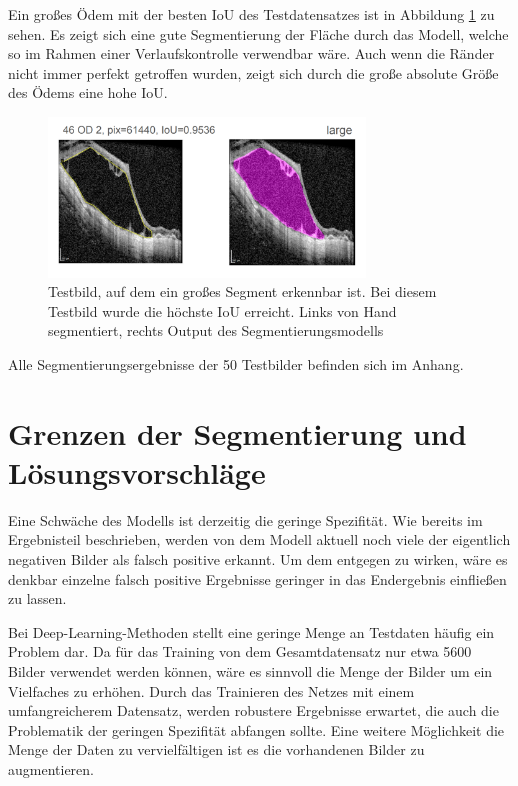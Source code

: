 Ein großes Ödem mit der besten IoU des Testdatensatzes ist in Abbildung \ref{fig:ergebnis_good3} zu sehen. Es zeigt sich eine gute Segmentierung der Fläche durch das Modell, welche so im Rahmen einer Verlaufskontrolle verwendbar wäre. Auch wenn die Ränder nicht immer perfekt getroffen wurden, zeigt sich durch die große absolute Größe des Ödems eine hohe IoU.\newline
\begin{figure}[ht!]
\centering
\includegraphics[width=0.75\textwidth]{./pic/Segmentierung/Segmentierungsergebnisse/50.PNG}
\caption{\label{fig:ergebnis_good3}Testbild, auf dem ein großes Segment erkennbar ist. Bei diesem Testbild wurde die höchste IoU erreicht. Links von Hand segmentiert, rechts Output des Segmentierungsmodells}
\end{figure}
Alle Segmentierungsergebnisse der 50 Testbilder befinden sich im Anhang.



\newpage
\section{Grenzen der Segmentierung und Lösungsvorschläge}


Eine Schwäche des Modells ist derzeitig die geringe Spezifität. Wie bereits im Ergebnisteil beschrieben, werden von dem Modell aktuell noch viele der eigentlich negativen Bilder als falsch positive erkannt. 
Um dem entgegen zu wirken, wäre es denkbar einzelne falsch positive Ergebnisse geringer in das Endergebnis einfließen zu lassen. 


Bei Deep-Learning-Methoden stellt eine geringe Menge an Testdaten häufig ein Problem dar. 
Da für das Training von dem Gesamtdatensatz nur etwa 5600 Bilder verwendet werden können, wäre es sinnvoll die Menge der Bilder um ein Vielfaches zu erhöhen. Durch das Trainieren des Netzes mit einem umfangreicherem Datensatz, werden robustere Ergebnisse erwartet, die auch die Problematik der geringen Spezifität abfangen sollte. 
Eine weitere Möglichkeit die Menge der Daten zu vervielfältigen ist es die vorhandenen Bilder zu augmentieren. 





